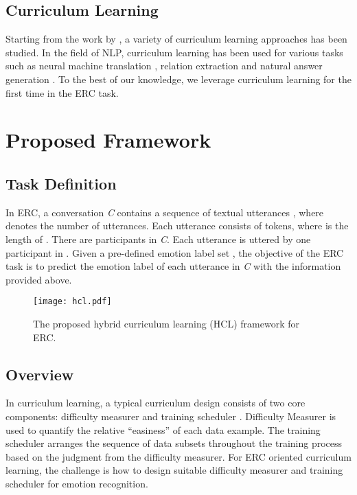 \documentclass[letterpaper]{article} \usepackage{aaai22}  \usepackage{times}  \usepackage{helvet}  \usepackage{courier}  \usepackage[hyphens]{url}  \usepackage{graphicx} \urlstyle{rm} \def\UrlFont{\rm}  \usepackage{natbib}  \usepackage{caption} \DeclareCaptionStyle{ruled}{labelfont=normalfont,labelsep=colon,strut=off} \frenchspacing  \setlength{\pdfpagewidth}{8.5in}  \setlength{\pdfpageheight}{11in}
\begin{document}
\subsection{Curriculum Learning}

Starting from the work by \citet{bengio2009curriculum}, a variety of curriculum learning approaches \citep{wang2020survey, soviany2021curriculum} has been studied. In the field of NLP, curriculum learning has been used for various tasks such as neural machine translation \citep{zhou2020uncertainty,liu2020norm},  relation extraction \cite{huang2019self} and  natural answer generation \cite{liu2018curriculum}. To the best of our knowledge,  we leverage  curriculum learning for the first time in the ERC task. 





\section{Proposed Framework}


\subsection{Task Definition}

In ERC, a conversation \emph{C} contains a  sequence of textual utterances  , where  denotes the number of utterances. Each utterance  consists of  tokens, where  is the length of . There are  participants   in  \emph{C}.  Each utterance  is uttered by one participant in  . Given a pre-defined emotion label set ,  the objective of the ERC task is to predict the emotion label of each utterance in \emph{C} with the information provided above.



\begin{figure*}[htbp]  	
	\centering  
	\texttt{[image: hcl.pdf]}
	\caption{The proposed hybrid curriculum learning (HCL) framework for ERC.}  
	\label{fig:hcl}  	
\end{figure*}


\subsection{Overview}

In curriculum learning, a typical curriculum design consists of two core components: difficulty measurer and training scheduler \cite{bengio2009curriculum}. Difficulty Measurer  is used to quantify the relative “easiness” of each data example. The training scheduler arranges the sequence of data subsets throughout the training process based on the judgment from the difficulty measurer. For ERC oriented curriculum learning, the challenge is how to design suitable difficulty measurer and training scheduler  for emotion recognition.
\end{document}
